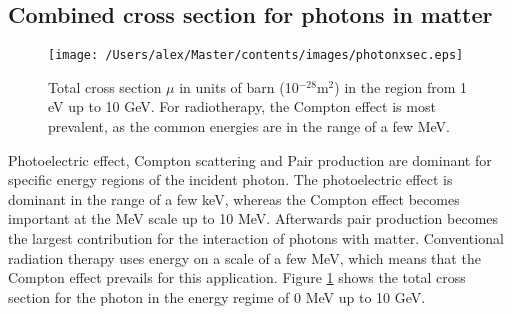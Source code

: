 \subsection{Combined cross section for photons in matter}
\begin{figure}[htp]
\centering
\texttt{[image: /Users/alex/Master/contents/images/photonxsec.eps]}
\caption{Total cross section $\mu$ in units of barn (10$^{-28}$m$^2$) in the region from 1 eV up to 10 GeV. For radiotherapy, the Compton effect is most prevalent, as the common energies are in the range of a few MeV.}
\label{fig:photonxsec}
\end{figure}
Photoelectric effect, Compton scattering and Pair production are dominant for specific energy regions of the incident photon. The photoelectric effect is dominant in the range of a few keV, whereas the Compton effect becomes important at the MeV scale up to 10 MeV. Afterwards pair production becomes the largest contribution for the interaction of photons with matter. Conventional radiation therapy uses energy on a scale of a few MeV, which means that the Compton effect prevails for this application. Figure \ref{fig:photonxsec} shows the total cross section for the photon in the energy regime of 0 MeV up to 10 GeV.
